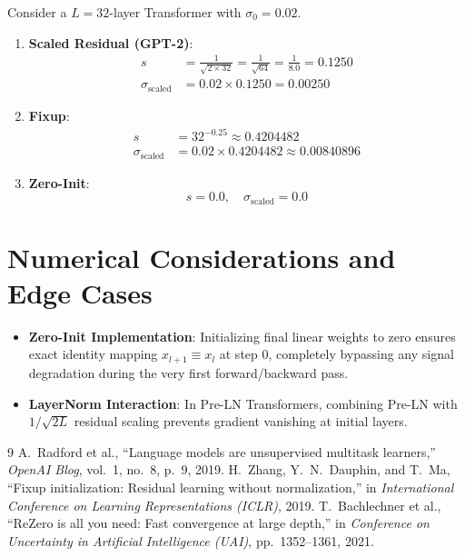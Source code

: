 \documentclass[11pt,a4paper]{article}
\theoremstyle{definition}
\begin{document}
Consider a $L = 32$-layer Transformer with $\sigma_0 = 0.02$.

\begin{enumerate}
    \item \textbf{Scaled Residual (GPT-2)}:
    \begin{align}
    s &= \frac{1}{\sqrt{2 \times 32}} = \frac{1}{\sqrt{64}} = \frac{1}{8.0} = 0.1250 \\
    \sigma_{\text{scaled}} &= 0.02 \times 0.1250 = 0.00250
    \end{align}
    \item \textbf{Fixup}:
    \begin{align}
    s &= 32^{-0.25} \approx 0.4204482 \\
    \sigma_{\text{scaled}} &= 0.02 \times 0.4204482 \approx 0.00840896
    \end{align}
    \item \textbf{Zero-Init}:
    \begin{equation}
    s = 0.0, \quad \sigma_{\text{scaled}} = 0.0
    \end{equation}
\end{enumerate}

\section{Numerical Considerations and Edge Cases}

\begin{itemize}
    \item \textbf{Zero-Init Implementation}: Initializing final linear weights to zero ensures exact identity mapping $x_{l+1} \equiv x_l$ at step $0$, completely bypassing any signal degradation during the very first forward/backward pass.
    \item \textbf{LayerNorm Interaction}: In Pre-LN Transformers, combining Pre-LN with $1/\sqrt{2L}$ residual scaling prevents gradient vanishing at initial layers.
\end{itemize}

\begin{thebibliography}{9}
 A.~Radford et al., ``Language models are unsupervised multitask learners,'' \emph{OpenAI Blog}, vol.~1, no.~8, p.~9, 2019.
 H.~Zhang, Y.~N.~Dauphin, and T.~Ma, ``Fixup initialization: Residual learning without normalization,'' in \emph{International Conference on Learning Representations (ICLR)}, 2019.
 T.~Bachlechner et al., ``ReZero is all you need: Fast convergence at large depth,'' in \emph{Conference on Uncertainty in Artificial Intelligence (UAI)}, pp.~1352--1361, 2021.
\end{thebibliography}
\end{document}

